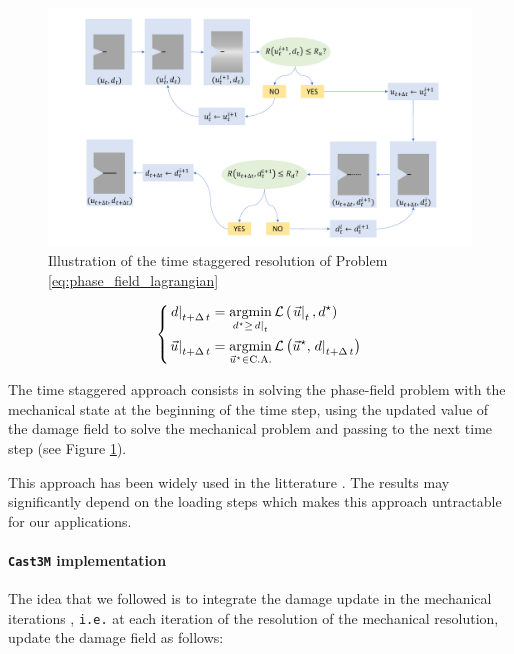 \begin{figure}[H]
  \centering
  \includegraphics[width=10.cm]{../chapter_001_literature_review/figures/time-staggered-resolution.pdf}
  \caption{Illustration of the time staggered resolution of Problem \eqref{eq:phase_field_lagrangian}}
  \label{fig:hho:phase_field:time_staggered_scheme}
\end{figure}

\[
\left\{
\begin{aligned}
  \left.d\right|_{t+\Delta\,t}       &= \underset{d^{\star}\geq\left.d\right|_{t}}{\mathrm{argmin}{}}\, \mathcal{L}\left(\left.\vec{u}\right|_{t},d^{\star}\right)\\
  \left.\vec{u}\right|_{t+\Delta\,t} &= \underset{\vec{u}^{\star}\in\text{C.A.}}{\mathrm{argmin}{}}\, \mathcal{L}\left(\vec{u}^{\star},\left.d\right|_{t+\Delta\,t}\right)
\end{aligned}
\right.
\]

The time staggered approach consists in solving the phase-field problem
with the mechanical state at the beginning of the time step, using the
updated value of the damage field to solve the mechanical problem and
passing to the next time step (see Figure
\ref{fig:hho:phase_field:time_staggered_scheme}).

This approach has been widely used in the litterature
\cite{miehe_phase_2010, nguyen_phase_2015, nguyen_phase-field_2016, molnar_2d_2017, molnar_open-source_2020}.
The results may significantly depend on the loading steps which makes
this approach untractable for our applications.

\paragraph{\texttt{Cast3M} implementation}
\label{sec:phase_field:castem_implementation}

The idea that we followed is to integrate the damage update in the
mechanical iterations \cite{helfer_modelisation_2017}, \texttt{i.e.} at each
iteration of the resolution of the mechanical resolution, update the
damage field as follows:

